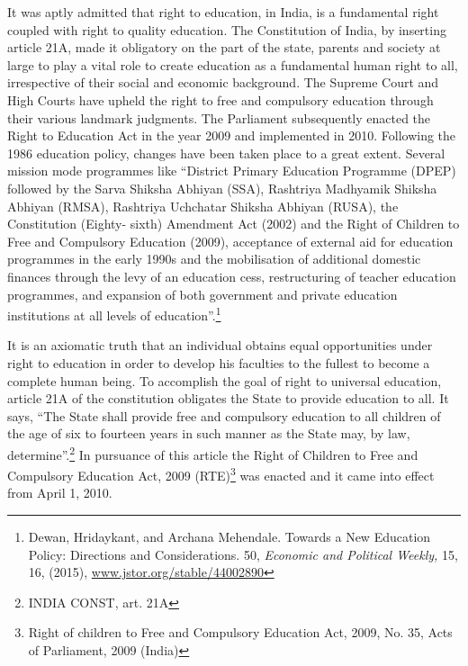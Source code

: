 \begin{multicols}{2}
\noi
It was aptly admitted that right to education, in India, is a fundamental right coupled with
right to quality education. The Constitution of India, by inserting article 21A, made it
obligatory on the part of the state, parents and society at large to play a vital role to create
education as a fundamental human right to all, irrespective of their social and economic
background. The Supreme Court and High Courts have upheld the right to free and
compulsory education through their various landmark judgments. The Parliament
subsequently enacted the Right to Education Act in the year 2009 and implemented in 2010.
Following the 1986 education policy, changes have been taken place to a great extent.
Several mission mode programmes like “District Primary Education Programme (DPEP)
followed by the Sarva Shiksha Abhiyan (SSA), Rashtriya Madhyamik Shiksha Abhiyan
(RMSA), Rashtriya Uchchatar Shiksha Abhiyan (RUSA), the Constitution (Eighty- sixth)
Amendment Act (2002) and the Right of Children to Free and Compulsory Education (2009),
acceptance of external aid for education programmes in the early 1990s and the mobilisation
of additional domestic finances through the levy of an education cess, restructuring of teacher
education programmes, and expansion of both government and private education institutions
at all levels of education”.\footnote{Dewan, Hridaykant, and Archana Mehendale. Towards a New Education Policy: Directions and Considerations. 50, \textit{Economic and Political Weekly,} 15, 16, (2015), \url{www.jstor.org/stable/44002890}}

\vspace{-.1cm}


\vspace{-.1cm}

\noi
It is an axiomatic truth that an individual obtains equal opportunities under right to education
in order to develop his faculties to the fullest to become a complete human being. To
accomplish the goal of right to universal education, article 21A of the constitution obligates
the State to provide education to all. It says, “The State shall provide free and compulsory
education to all children of the age of six to fourteen years in such manner as the State may,
by law, determine”.\footnote{INDIA CONST, art. 21A} In pursuance of this article the Right of Children to Free and
Compulsory Education Act, 2009 (RTE)\footnote{Right of children to Free and Compulsory Education Act, 2009, No. 35, Acts of Parliament, 2009 (India)} was enacted and it came into effect from April 1, 2010.


\end{multicols}
